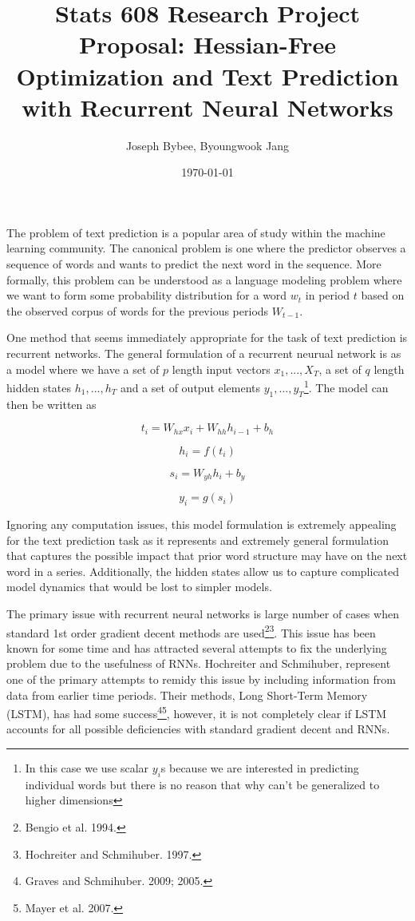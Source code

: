\documentclass{article}
\begin{document}
\title{Stats 608 Research Project Proposal: Hessian-Free Optimization and Text Prediction with Recurrent Neural Networks}
\author{Joseph Bybee, Byoungwook Jang}
\date{\today}

\maketitle

The problem of text prediction is a popular area of study within the machine learning community.  The canonical problem is one where the predictor observes a sequence of words and wants to predict the next word in the sequence.  More formally, this problem can be understood as a language modeling problem where we want to form some probability distribution for a word $w_t$ in period $t$ based on the observed corpus of words for the previous periods $W_{t-1}$.

One method that seems immediately appropriate for the task of text prediction is recurrent networks.  The general formulation of a recurrent neurual network is as a model where we have a set of $p$ length input vectors $x_1,...,X_T$, a set of $q$ length hidden states $h_1,...,h_T$ and a set of output elements $y_1,...,y_T$\footnote{In this case we use scalar $y_i$s because we are interested in predicting individual words but there is no reason that why can't be generalized to higher dimensions}.  The model can then be written as

\[t_i = W_{hx} x_i + W_{hh} h_{i-1} + b_h\]

\[h_i = f(t_i)\]

\[s_i = W_{yh} h_i + b_y\]

\[y_i = g(s_i)\]

Ignoring any computation issues, this model formulation is extremely appealing for the text prediction task as it represents and extremely general formulation that captures the possible impact that prior word structure may have on the next word in a series.  Additionally, the hidden states allow us to capture complicated model dynamics that would be lost to simpler models.

The primary issue with recurrent neural networks is large number of cases when standard 1st order gradient decent methods are used\footnote{Bengio et al. 1994.}\footnote{Hochreiter and Schmihuber. 1997.}.  This issue has been known for some time and has attracted several attempts to fix the underlying problem due to the usefulness of RNNs.  Hochreiter and Schmihuber, represent one of the primary attempts to remidy this issue by including information from data from earlier time periods.  Their methods, Long Short-Term Memory (LSTM), has had some success\footnote{Graves and Schmihuber. 2009; 2005.}\footnote{Mayer et al. 2007.}, however, it is not completely clear if LSTM accounts for all possible deficiencies with standard gradient decent and RNNs.
\end{document}
